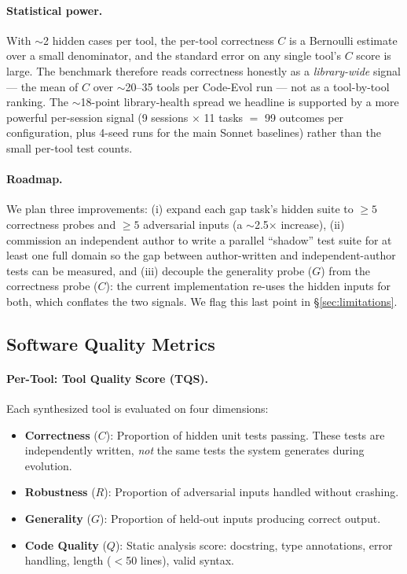 \documentclass[sigplan,nonacm,natbib=false]{acmart}
\begin{document}
\paragraph{Statistical power.} With $\sim$2 hidden cases per tool, the per-tool correctness $C$ is a Bernoulli estimate over a small denominator, and the standard error on any single tool's $C$ score is large. The benchmark therefore reads correctness honestly as a \emph{library-wide} signal --- the mean of $C$ over $\sim$20--35 tools per Code-Evol run --- not as a tool-by-tool ranking. The $\sim$18-point library-health spread we headline is supported by a more powerful per-session signal (9 sessions $\times$ 11 tasks $=$ 99 outcomes per configuration, plus 4-seed runs for the main Sonnet baselines) rather than the small per-tool test counts.

\paragraph{Roadmap.} We plan three improvements: (i) expand each gap task's hidden suite to $\geq 5$ correctness probes and $\geq 5$ adversarial inputs (a $\sim$2.5$\times$ increase), (ii) commission an independent author to write a parallel ``shadow'' test suite for at least one full domain so the gap between author-written and independent-author tests can be measured, and (iii) decouple the generality probe ($G$) from the correctness probe ($C$): the current implementation re-uses the hidden inputs for both, which conflates the two signals. We flag this last point in \S\ref{sec:limitations}.

\subsection{Software Quality Metrics}

\paragraph{Per-Tool: Tool Quality Score (TQS).}
Each synthesized tool is evaluated on four dimensions:

\begin{itemize}
\item \textbf{Correctness} ($C$): Proportion of hidden unit tests passing. These tests are independently written, \emph{not} the same tests the system generates during evolution.
\item \textbf{Robustness} ($R$): Proportion of adversarial inputs handled without crashing.
\item \textbf{Generality} ($G$): Proportion of held-out inputs producing correct output.
\item \textbf{Code Quality} ($Q$): Static analysis score: docstring, type annotations, error handling, length ($<$50 lines), valid syntax.
\end{itemize}
\end{document}
